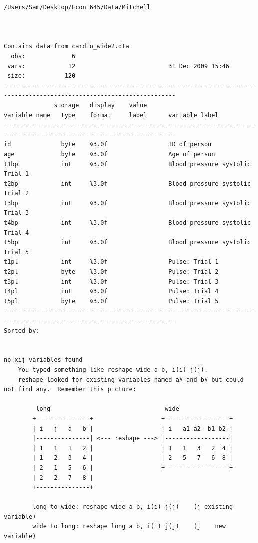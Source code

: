 \documentclass[
]{book}
\begin{document}
\begin{verbatim}
/Users/Sam/Desktop/Econ 645/Data/Mitchell



Contains data from cardio_wide2.dta
  obs:             6                          
 vars:            12                          31 Dec 2009 15:46
 size:           120                          
----------------------------------------------------------------------------------------------------------------------
              storage   display    value
variable name   type    format     label      variable label
----------------------------------------------------------------------------------------------------------------------
id              byte    %3.0f                 ID of person
age             byte    %3.0f                 Age of person
t1bp            int     %3.0f                 Blood pressure systolic Trial 1
t2bp            int     %3.0f                 Blood pressure systolic Trial 2
t3bp            int     %3.0f                 Blood pressure systolic Trial 3
t4bp            int     %3.0f                 Blood pressure systolic Trial 4
t5bp            int     %3.0f                 Blood pressure systolic Trial 5
t1pl            int     %3.0f                 Pulse: Trial 1
t2pl            byte    %3.0f                 Pulse: Trial 2
t3pl            int     %3.0f                 Pulse: Trial 3
t4pl            int     %3.0f                 Pulse: Trial 4
t5pl            byte    %3.0f                 Pulse: Trial 5
----------------------------------------------------------------------------------------------------------------------
Sorted by: 


no xij variables found
    You typed something like reshape wide a b, i(i) j(j).
    reshape looked for existing variables named a# and b# but could not find any.  Remember this picture:

         long                                wide
        +---------------+                   +------------------+
        | i   j   a   b |                   | i   a1 a2  b1 b2 |
        |---------------| <--- reshape ---> |------------------|
        | 1   1   1   2 |                   | 1   1   3   2  4 |
        | 1   2   3   4 |                   | 2   5   7   6  8 |
        | 2   1   5   6 |                   +------------------+
        | 2   2   7   8 |
        +---------------+

        long to wide: reshape wide a b, i(i) j(j)    (j existing variable)
        wide to long: reshape long a b, i(i) j(j)    (j    new   variable)
\end{verbatim}
\end{document}
